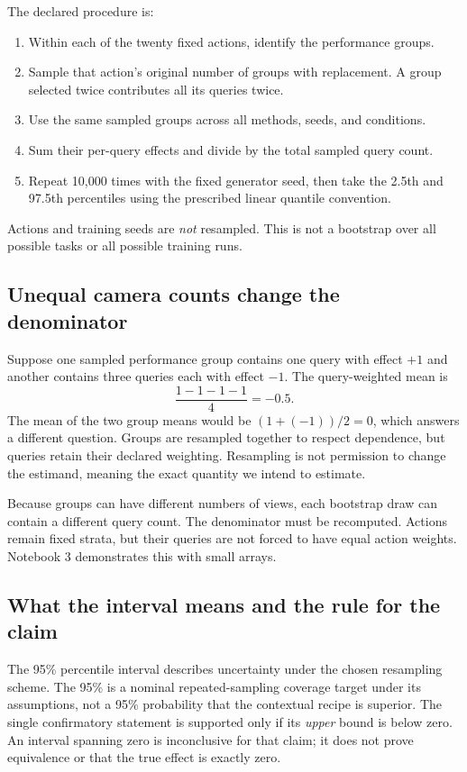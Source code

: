 The declared procedure is:
\begin{enumerate}
\item Within each of the twenty fixed actions, identify the performance groups.
\item Sample that action's original number of groups with replacement. A group
selected twice contributes all its queries twice.
\item Use the same sampled groups across all methods, seeds, and conditions.
\item Sum their per-query effects and divide by the total sampled query count.
\item Repeat 10,000 times with the fixed generator seed, then take the 2.5th and
97.5th percentiles using the prescribed linear quantile convention.
\end{enumerate}
Actions and training seeds are \emph{not} resampled. This is not a bootstrap
over all possible tasks or all possible training runs.

\subsection{Unequal camera counts change the denominator}
Suppose one sampled performance group contains one query with effect $+1$ and
another contains three queries each with effect $-1$. The query-weighted mean is
\[
 \frac{1-1-1-1}{4}=-0.5.
\]
The mean of the two group means would be $(1+(-1))/2=0$, which answers a
different question. Groups are resampled together to respect dependence, but
queries retain their declared weighting. Resampling is not permission to change
the estimand, meaning the exact quantity we intend to estimate.

Because groups can have different numbers of views, each bootstrap draw can
contain a different query count. The denominator must be recomputed. Actions
remain fixed strata, but their queries are not forced to have equal action
weights. Notebook 3 demonstrates this with small arrays.

\subsection{What the interval means and the rule for the claim}
The 95\% percentile interval describes uncertainty under the chosen resampling
scheme. The 95\% is a nominal repeated-sampling coverage target under its
assumptions, not a 95\% probability that the contextual recipe is superior.
The single confirmatory statement is supported only if its \emph{upper}
bound is below zero. An interval spanning zero is inconclusive for that claim;
it does not prove equivalence or that the true effect is exactly zero.

